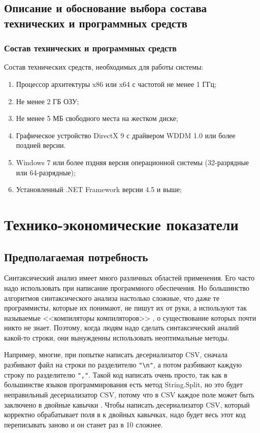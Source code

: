 \documentclass[a4paper,12pt]{article}
\begin{document}
  \subsection{Описание и обоснование выбора состава технических и программных средств}
  \subsubsection{Состав технических и программных средств}
  Состав технических средств, необходимых для работы системы:
  \begin{enumerate}
    \item Процессор архитектуры x86 или x64 с частотой не менее 1 ГГц;
    \item Не менее 2 ГБ ОЗУ;
    \item Не менее 5 МБ свободного места на жестком диске;
    \item Графическое устройство DirectX 9 с драйвером WDDM 1.0 или более поздней версии.
    \item Windows 7 или более пздняя версия операционной системы (32-разрядные или 64-разрядные);
    \item Установленный .NET Framework версии 4.5 и выше;
  \end{enumerate}

  \newpage
  \section{Технико-экономические показатели}
  \subsection{Предполагаемая потребность}
  Синтаксический анализ имеет много различных областей применения.
  Его часто надо использовать при написание программного обеспечения.
  Но большинство алгоритмов синтаксического анализа настолько сложные, что даже те программисты, которые их понимают,
  не пишут их от руки, а используют так называемые <<компиляторы компиляторов>> \cite{parser},
  о существование которых почти никто не знает.
  Поэтому, когда людям надо сделать синтаксический аналий какой-то строки, они вынужденны использовать неоптимальные методы.

  Например, многие, при попытке написать десериализатор CSV,
  сначала разбивают файл на строки по разделителю \texttt{"{}\textbackslash{}n"{}},
  а потом разбивают каждую строку по разделителю \texttt{"{},"{}}.
  Такой код написать очень просто, так как в большинстве языков программирования есть метод String.Split,
  но это будет неправильный десериализатор CSV, потому что в CSV каждое поле может быть заключено в двойные кавычки \cite{csv}.
  Чтобы написать десериализатор CSV, который корректно обрабатывает поля в к двойных кавычках,
  надо будет весь этот код переписывать заново и он станет раз в 10 сложнее.
\end{document}
